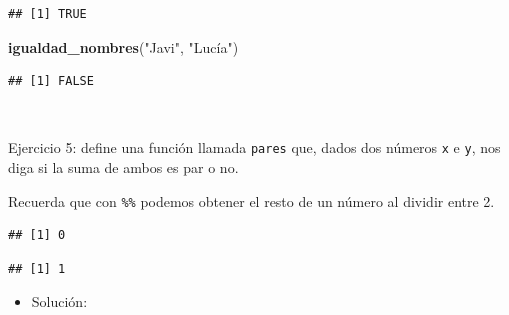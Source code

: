 \documentclass[11pt,]{book}
\newenvironment{Shaded}{\begin{snugshade}}{\end{snugshade}}
\newcommand{\CommentTok}[1]{\textcolor[rgb]{0.37,0.37,0.37}{\textit{#1}}}
\newcommand{\DecValTok}[1]{\textcolor[rgb]{0.06,0.06,0.06}{#1}}
\newcommand{\KeywordTok}[1]{\textcolor[rgb]{0.27,0.27,0.27}{\textbf{#1}}}
\newcommand{\NormalTok}[1]{#1}
\newcommand{\OperatorTok}[1]{\textcolor[rgb]{0.43,0.43,0.43}{\textbf{#1}}}
\newcommand{\StringTok}[1]{\textcolor[rgb]{0.5,0.5,0.5}{#1}}
\providecommand{\tightlist}{%
  \setlength{\itemsep}{0pt}\setlength{\parskip}{0pt}}
\begin{document}
\begin{verbatim}
## [1] TRUE
\end{verbatim}

\begin{Shaded}
\begin{Highlighting}[]
\KeywordTok{igualdad_nombres}\NormalTok{(}\StringTok{"Javi"}\NormalTok{, }\StringTok{"Lucía"}\NormalTok{)}
\end{Highlighting}
\end{Shaded}

\begin{verbatim}
## [1] FALSE
\end{verbatim}

~

Ejercicio 5: define una función llamada \texttt{pares} que, dados dos números \texttt{x} e \texttt{y}, nos diga si la suma de ambos es par o no.

Recuerda que con \texttt{\%\%} podemos obtener el resto de un número al dividir entre 2.

\begin{Shaded}
\end{Shaded}

\begin{verbatim}
## [1] 0
\end{verbatim}

\begin{Shaded}
\end{Shaded}

\begin{verbatim}
## [1] 1
\end{verbatim}

\begin{itemize}
\tightlist
\item
  Solución:
\end{itemize}
\end{document}
